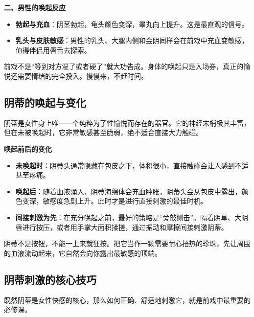 \documentclass[12pt,UTF8]{ctexbook}
\begin{document}
\textbf{二、男性的唤起反应}

\begin{itemize}
\item \textbf{勃起与充血}：阴茎勃起，龟头颜色变深，睾丸向上提升。这是最直观的信号。
\item \textbf{乳头与皮肤敏感}：男性的乳头、大腿内侧和会阴同样会在前戏中充血变敏感，值得伴侣用唇舌去探索。
\end{itemize}

\begin{tcolorbox}[colback=pink!5!white,colframe=red!50!black,title=贴心小叮咛]
前戏不是“等到对方湿了或者硬了”就大功告成。身体的唤起只是入场券，真正的愉悦还需要情绪的完全投入。慢慢来，不赶时间。
\end{tcolorbox}

\subsection{阴蒂的唤起与变化}

阴蒂是女性身上唯一一个纯粹为了性愉悦而存在的器官。它的神经末梢极其丰富，但在未被唤起时，它非常敏感甚至脆弱，绝不适合直接大力触碰。

\textbf{唤起前后的变化}

\begin{itemize}
\item \textbf{未唤起时}：阴蒂头通常隐藏在包皮之下，体积很小，直接触碰会让人感到不适甚至疼痛。
\item \textbf{唤起后}：随着血液涌入，阴蒂海绵体会充血肿胀，阴蒂头会从包皮中露出，颜色变深，敏感度急剧上升。此时才是进行直接刺激的最佳时机。
\item \textbf{间接刺激为先}：在充分唤起之前，最好的策略是“旁敲侧击”。隔着阴阜、大阴唇进行按压，或者用手掌大面积揉搓，通过振动和摩擦间接刺激阴蒂。
\end{itemize}

\begin{tcolorbox}[colback=pink!5!white,colframe=red!50!black,title=贴心小叮咛]
阴蒂不是按钮，不能一上来就狂按。把它当作一颗需要耐心捂热的珍珠，先让周围的血液流动起来，它自然会向你露出最敏感的顶端。
\end{tcolorbox}

\subsection{阴蒂刺激的核心技巧}

既然阴蒂是女性快感的核心，那么如何正确、舒适地刺激它，就是前戏中最重要的必修课。
\end{document}
